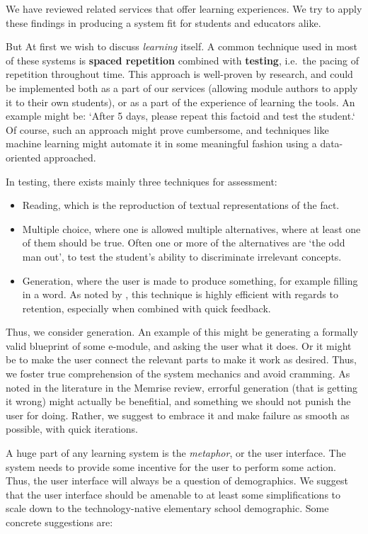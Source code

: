 We have reviewed related services that offer learning experiences. We try to 
apply these findings in producing a system fit for students and educators 
alike.

But At first we wish to discuss \textit{learning} itself. A common technique 
used in most of these systems is \textbf{spaced repetition} combined with 
\textbf{testing}, i.e.\ the pacing of repetition throughout time. This 
approach is well-proven by research, and could be implemented both as a part 
of our services (allowing module authors to apply it to their own students), 
or as a part of the experience of learning the tools. An example might be: 
`After 5 days, please repeat this factoid and test the student.` Of course, 
such an approach might prove cumbersome, and techniques like machine learning 
might automate it in some meaningful fashion using a data-oriented approached.

In testing, there exists mainly three techniques for assessment:

\begin{itemize}
\item Reading, which is the reproduction of textual representations of the fact.
\item Multiple choice, where one is allowed multiple alternatives, where at
least one of them should be true. Often one or more of the alternatives are `the
odd man out', to test the student's ability to discriminate irrelevant concepts.
\item Generation, where the user is made to produce something, for example
filling in a word. As noted by \cite{potts2014benefit}, this technique is 
highly efficient with regards to retention, especially when combined with 
quick feedback.
\end{itemize}

Thus, we consider generation. An example of this might be generating a formally
valid blueprint of some e-module, and asking the user what it does. Or it might
be to make the user connect the relevant parts to make it work as desired. Thus,
we foster true comprehension of the system mechanics and avoid cramming. As
noted in the literature in the Memrise review, errorful generation (that is
getting it wrong) might actually be benefitial, and something we should not
punish the user for doing. Rather, we suggest to embrace it and make failure as
smooth as possible, with quick iterations.

A huge part of any learning system is the \textit{metaphor}, or the user
interface. The system needs to provide some incentive for the user to perform
some action. Thus, the user interface will always be a question of demographics.
We suggest that the user interface should be amenable to at least some
simplifications to scale down to the technology-native elementary school
demographic. Some concrete suggestions are:

